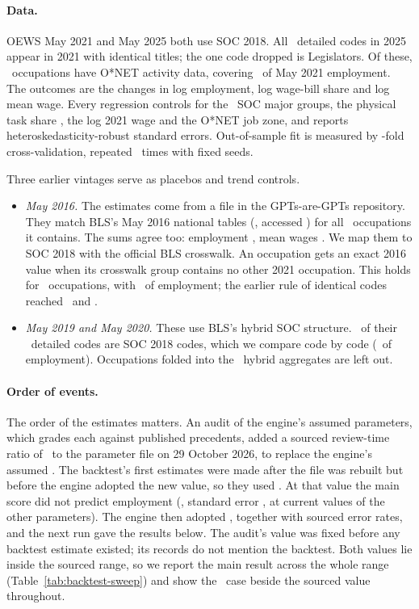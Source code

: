 \paragraph{Data.} OEWS May 2021 and May 2025 both use SOC 2018. All \btNcodes\ detailed codes in 2025 appear in 2021 with identical titles; the one code dropped is Legislators. Of these, \btNocc\ occupations have O*NET activity data, covering \btEmpShare\ of May 2021 employment. The outcomes are the changes in log employment, log wage-bill share and log mean wage. Every regression controls for the \btNmajor\ SOC major groups, the physical task share \citep{tomlinson2025working}, the log 2021 wage and the O*NET job zone, and reports heteroskedasticity-robust standard errors. Out-of-sample fit is measured by \btFolds-fold cross-validation, repeated \btReps\ times with fixed seeds.

Three earlier vintages serve as placebos and trend controls.
\begin{itemize}
\item \emph{May 2016.} The estimates come from a file in the GPTs-are-GPTs repository. They match BLS's May 2016 national tables (\btVerUrl, accessed \btVerDate) for all \btVerN\ occupations it contains. The sums agree too: employment \btVerSumEmp, mean wages \btVerSumWage. We map them to SOC 2018 with the official BLS crosswalk. An occupation gets an exact 2016 value when its crosswalk group contains no other 2021 occupation. This holds for \btXwExactN\ occupations, with \btXwExactShare\ of employment; the earlier rule of identical codes reached \btIdN\ and \btIdShare.
\item \emph{May 2019 and May 2020.} These use BLS's hybrid SOC structure. \btHybSame\ of their \btHybN\ detailed codes are SOC 2018 codes, which we compare code by code (\btShareOneNineTwoOne\ of employment). Occupations folded into the \btHybAgg\ hybrid aggregates are left out.
\end{itemize}

\paragraph{Order of events.} The order of the estimates matters. An audit of the engine's assumed parameters, which grades each against published precedents, added a sourced review-time ratio of \btRhoRev\ to the parameter file on 29 October 2026, to replace the engine's assumed \btRhoOld. The backtest's first estimates were made after the file was rebuilt but before the engine adopted the new value, so they used \btRhoOld. At that value the main score did not predict employment (\btMOldB, standard error \btMOldSe, at current values of the other parameters). The engine then adopted \btRhoRev, together with sourced error rates, and the next run gave the results below. The audit's value was fixed before any backtest estimate existed; its records do not mention the backtest. Both values lie inside the sourced range, so we report the main result across the whole range (Table~\ref{tab:backtest-sweep}) and show the \btRhoOld\ case beside the sourced value throughout.

